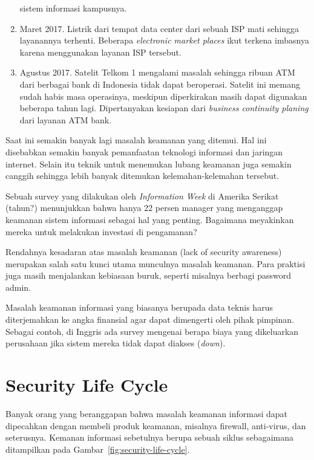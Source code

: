 \begin{enumerate}
   sistem informasi kampusnya.
\item Maret 2017. Listrik dari tempat data center dari sebuah ISP mati sehingga
   layanannya terhenti. Beberapa {\em electronic market places} ikut terkena
      imbasnya karena menggunakan layanan ISP tersebut.
\item Agustus 2017. Satelit Telkom 1 mengalami masalah sehingga ribuan ATM
   dari berbagai bank di Indonesia tidak dapat beroperasi. Satelit ini
   memang sudah habis masa operasinya, meskipun diperkirakan masih dapat
   digunakan beberapa tahun lagi. Dipertanyakan kesiapan dari {\em business
   continuity planing} dari layanan ATM bank.
\end{enumerate}

Saat ini semakin banyak lagi masalah keamanan yang ditemui.
Hal ini disebabkan semakin banyak pemanfaatan teknologi informasi dan
jaringan internet.
Selain itu teknik untuk menemukan lubang keamanan juga semakin
canggih sehingga lebih banyak ditemukan kelemahan-kelemahan tersebut.

Sebuah survey yang dilakukan oleh {\em Information Week} di Amerika
Serikat (tahun?) menunjukkan bahwa hanya 22 persen manager yang
menganggap keamanan sistem informasi sebagai hal yang penting.
Bagaimana meyakinkan mereka untuk melakukan investasi di pengamanan?

Rendahnya kesadaran atas masalah keamanan (lack of security awareness)
merupakan salah satu kunci utama munculnya masalah keamanan.
Para praktisi juga masih menjalankan kebiasaan buruk,
seperti misalnya berbagi password admin.

Masalah keamanan informasi yang biasanya berupada data teknis
harus diterjemahkan ke angka finansial agar dapat dimengerti 
oleh pihak pimpinan.
Sebagai contoh, di Inggris ada survey mengenai berapa biaya
yang dikeluarkan perusahaan jika sistem mereka tidak dapat
diakses ({\em down}).



\section{Security Life Cycle}
Banyak orang yang beranggapan bahwa masalah keamanan informasi
dapat dipecahkan dengan membeli produk keamanan,
misalnya firewall, anti-virus, dan seterusnya.
Kemanan informasi sebetulnya berupa sebuah siklus
sebagaimana ditampilkan pada Gambar~\ref{fig:security-life-cycle}.

